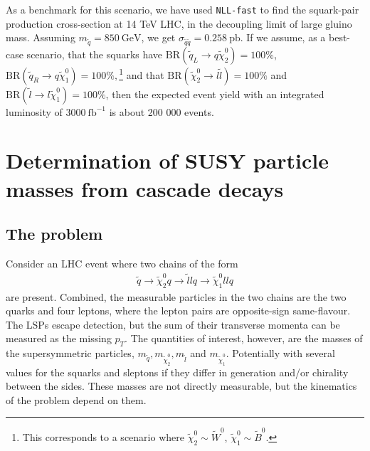 \documentclass[twoside,english]{uiofysmaster}
\begin{document}
As a benchmark for this scenario, we have used {\tt NLL-fast} to find the squark-pair production cross-section at 14 TeV LHC, in the decoupling limit of large gluino mass. Assuming $m_{\tilde q} = 850~\mathrm{GeV}$, we get $\sigma_{\tilde q \tilde q} = 0.258~\mathrm{pb}$. If we assume, as a best-case scenario, that the squarks have $\mathrm{BR}(\tilde q_L \to q\tilde\chi_2^0)=100\%$, $\mathrm{BR}(\tilde q_R \to q\tilde\chi_1^0)=100\%,$\footnote{This corresponds to a scenario where $\tilde\chi_2^0\sim \tilde W^0$, $\tilde\chi_1^0\sim \tilde B^0$.} and that $\mathrm{BR}(\tilde\chi_2^0\to l\tilde l)=100\%$ and $\mathrm{BR}(\tilde l \to l\tilde\chi_1^0)=100\%$, then the expected event yield with an integrated luminosity of $3000~\mathrm{fb}^{-1}$ is about 200 000 events.



















\chapter{Determination of SUSY particle masses from cascade decays}%
\label{ch:introducing_the_method}




\section{The problem}
Consider an LHC event where two chains of the form
\begin{align}
	\tilde q \to \tilde\chi_2^0q \to \tilde l l q \to \tilde \chi_1^0 ll q\label{eq:goldencascade}
\end{align}
are present. Combined, the measurable particles in the two chains are the two quarks and four leptons, where the lepton pairs are opposite-sign same-flavour. The LSPs escape detection, but the sum of their transverse momenta can be measured as the missing $p_T$. The quantities of interest, however, are the masses of the supersymmetric particles, $m_{\tilde{q}}, m_{\tilde{\chi}_2^0}, m_{\tilde{l}}$ and $m_{\tilde{\chi}_1^0}$. Potentially with several values for the squarks and sleptons if they differ in generation and/or chirality between the sides. These masses are not directly measurable, but the kinematics of the problem depend on them. 
\end{document}

